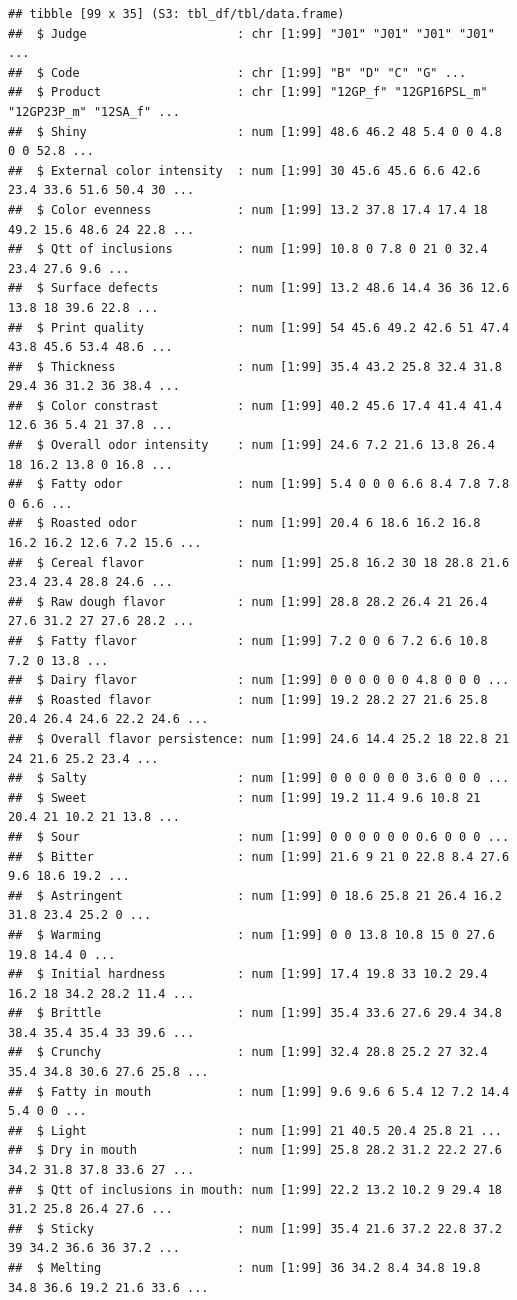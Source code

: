 \documentclass[
]{book}
\begin{document}
\begin{verbatim}
## tibble [99 x 35] (S3: tbl_df/tbl/data.frame)
##  $ Judge                     : chr [1:99] "J01" "J01" "J01" "J01" ...
##  $ Code                      : chr [1:99] "B" "D" "C" "G" ...
##  $ Product                   : chr [1:99] "12GP_f" "12GP16PSL_m" "12GP23P_m" "12SA_f" ...
##  $ Shiny                     : num [1:99] 48.6 46.2 48 5.4 0 0 4.8 0 0 52.8 ...
##  $ External color intensity  : num [1:99] 30 45.6 45.6 6.6 42.6 23.4 33.6 51.6 50.4 30 ...
##  $ Color evenness            : num [1:99] 13.2 37.8 17.4 17.4 18 49.2 15.6 48.6 24 22.8 ...
##  $ Qtt of inclusions         : num [1:99] 10.8 0 7.8 0 21 0 32.4 23.4 27.6 9.6 ...
##  $ Surface defects           : num [1:99] 13.2 48.6 14.4 36 36 12.6 13.8 18 39.6 22.8 ...
##  $ Print quality             : num [1:99] 54 45.6 49.2 42.6 51 47.4 43.8 45.6 53.4 48.6 ...
##  $ Thickness                 : num [1:99] 35.4 43.2 25.8 32.4 31.8 29.4 36 31.2 36 38.4 ...
##  $ Color constrast           : num [1:99] 40.2 45.6 17.4 41.4 41.4 12.6 36 5.4 21 37.8 ...
##  $ Overall odor intensity    : num [1:99] 24.6 7.2 21.6 13.8 26.4 18 16.2 13.8 0 16.8 ...
##  $ Fatty odor                : num [1:99] 5.4 0 0 0 6.6 8.4 7.8 7.8 0 6.6 ...
##  $ Roasted odor              : num [1:99] 20.4 6 18.6 16.2 16.8 16.2 16.2 12.6 7.2 15.6 ...
##  $ Cereal flavor             : num [1:99] 25.8 16.2 30 18 28.8 21.6 23.4 23.4 28.8 24.6 ...
##  $ Raw dough flavor          : num [1:99] 28.8 28.2 26.4 21 26.4 27.6 31.2 27 27.6 28.2 ...
##  $ Fatty flavor              : num [1:99] 7.2 0 0 6 7.2 6.6 10.8 7.2 0 13.8 ...
##  $ Dairy flavor              : num [1:99] 0 0 0 0 0 0 4.8 0 0 0 ...
##  $ Roasted flavor            : num [1:99] 19.2 28.2 27 21.6 25.8 20.4 26.4 24.6 22.2 24.6 ...
##  $ Overall flavor persistence: num [1:99] 24.6 14.4 25.2 18 22.8 21 24 21.6 25.2 23.4 ...
##  $ Salty                     : num [1:99] 0 0 0 0 0 0 3.6 0 0 0 ...
##  $ Sweet                     : num [1:99] 19.2 11.4 9.6 10.8 21 20.4 21 10.2 21 13.8 ...
##  $ Sour                      : num [1:99] 0 0 0 0 0 0 0.6 0 0 0 ...
##  $ Bitter                    : num [1:99] 21.6 9 21 0 22.8 8.4 27.6 9.6 18.6 19.2 ...
##  $ Astringent                : num [1:99] 0 18.6 25.8 21 26.4 16.2 31.8 23.4 25.2 0 ...
##  $ Warming                   : num [1:99] 0 0 13.8 10.8 15 0 27.6 19.8 14.4 0 ...
##  $ Initial hardness          : num [1:99] 17.4 19.8 33 10.2 29.4 16.2 18 34.2 28.2 11.4 ...
##  $ Brittle                   : num [1:99] 35.4 33.6 27.6 29.4 34.8 38.4 35.4 35.4 33 39.6 ...
##  $ Crunchy                   : num [1:99] 32.4 28.8 25.2 27 32.4 35.4 34.8 30.6 27.6 25.8 ...
##  $ Fatty in mouth            : num [1:99] 9.6 9.6 6 5.4 12 7.2 14.4 5.4 0 0 ...
##  $ Light                     : num [1:99] 21 40.5 20.4 25.8 21 ...
##  $ Dry in mouth              : num [1:99] 25.8 28.2 31.2 22.2 27.6 34.2 31.8 37.8 33.6 27 ...
##  $ Qtt of inclusions in mouth: num [1:99] 22.2 13.2 10.2 9 29.4 18 31.2 25.8 26.4 27.6 ...
##  $ Sticky                    : num [1:99] 35.4 21.6 37.2 22.8 37.2 39 34.2 36.6 36 37.2 ...
##  $ Melting                   : num [1:99] 36 34.2 8.4 34.8 19.8 34.8 36.6 19.2 21.6 33.6 ...
\end{verbatim}
\end{document}
